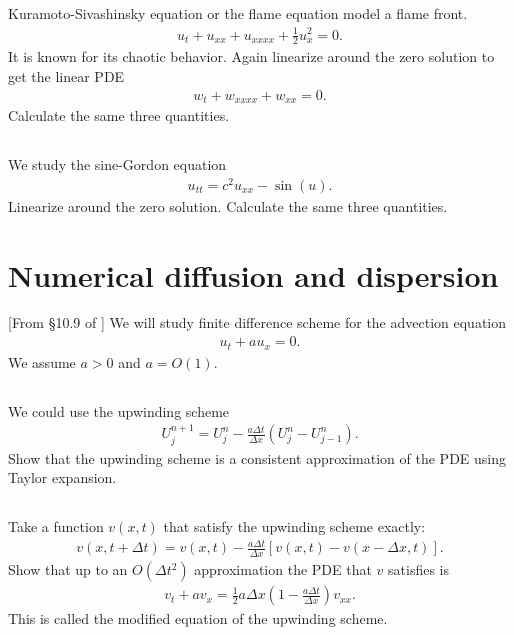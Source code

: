 \documentclass[11pt,letterpaper]{report}
\begin{document}
\subsection{}
Kuramoto-Sivashinsky equation or the flame equation model a flame front. 
\begin{align}
    u_t+u_{xx}+u_{xxxx}+\frac{1}{2}u_x^2 = 0.
\end{align}
It is known for its chaotic behavior. Again linearize around the zero solution to get the linear PDE
\begin{align}
    w_t+w_{xxxx}+w_{xx} = 0.
\end{align}
Calculate the same three quantities.

\subsection{}
We study the sine-Gordon equation
\begin{align}
    u_{tt} = c^2u_{xx}-\sin(u).
\end{align}
Linearize around the zero solution. Calculate the same three quantities.

\section{Numerical diffusion and dispersion}
[From \S 10.9 of \cite{LeVeque_07}] We will study finite difference scheme for the advection equation
\begin{align}
    u_t+au_x = 0.
\end{align}
We assume $a>0$ and $a=O(1)$. 

\subsection{}
We could use the upwinding scheme
\begin{align}
    U^{n+1}_j = U^n_j-\frac{a\Delta t}{\Delta x}\left( U^n_j-U^n_{j-1} \right).
\end{align}
Show that the upwinding scheme is a consistent approximation of the PDE using Taylor expansion. 

\subsection{}
Take a function $v(x,t)$ that satisfy the upwinding scheme exactly:
\begin{align}
    v(x,t+\Delta t)=v(x,t)-\frac{a\Delta t}{\Delta x}\left[v(x,t)-v(x-\Delta x,t)\right].
\end{align}
Show that up to an $O(\Delta t^2)$ approximation the PDE that $v$ satisfies is
\begin{align}
    v_t+av_x = \frac{1}{2}a\Delta x\left(1-\frac{a\Delta t}{\Delta x}\right)v_{xx}.
\end{align}
This is called the modified equation of the upwinding scheme.
\end{document}
